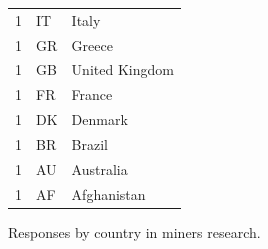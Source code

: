 \documentclass[
  printed, %
  table,   %
  lof,     %
  lot,     %
           oneside, color
]{fithesis3}
\begin{document}
\begin{figure}[H]
\begin{tabular}{lll}
1                            & IT                         & Italy                 \\
1                            & GR                         & Greece                \\
1                            & GB                         & United Kingdom        \\
1                            & FR                         & France                \\
1                            & DK                         & Denmark               \\
1                            & BR                         & Brazil                \\
1                            & AU                         & Australia             \\
1                            & AF                         & Afghanistan           \\
\end{tabular}
\caption{Responses by country in miners research.}
\label{table:countriesminers}
\end{figure}


\label{monero-user-study-pdf}


\label{monero-miners-study-pdf}

%
%
\end{document}
